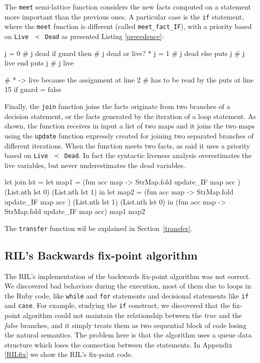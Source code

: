 \documentclass[a4paper]{article}   %
\begin{document}
The \texttt{meet} semi-lattice function considers the new facts computed on a statement more important than the previous ones. A particular case is the \texttt{if} statement, where the \texttt{meet} function is different (called \texttt{meet\_fact\_IF}), with a priority based on \texttt{Live $\prec$ Dead} as presented Listing \ref{precedence}: 
\begin{ruby}[frame=tb, label=precedence, caption={Particular case for the \texttt{meet} function}]
j = 0                       # j dead
if guard then               # j dead or live? *
    j = 1                   # j dead
else
    puts j                  # j live
end
puts j                      # j live

# * -> live because the assignment at line 2
# has to be read by the puts at line 15 if guard = false
\end{ruby}

Finally, the \texttt{join} function joins the facts originate from two branches of a decision statement, or the facts generated by the iteration of a loop statement. As shown, the function receives in input a list of two maps and it joins the two maps using the \texttt{update} function expressly created for joining two separated branches of different iterations. 
When the function meets two facts, as said it uses a priority based on \texttt{Live $\prec$ Dead}. In fact the syntactic liveness analysis overestimates the live variables, but never underestimates the dead variables.
\begin{ocaml}
 let join lst =	
     let map1 = (fun acc map -> 
                    StrMap.fold update_IF map acc
                ) (List.nth lst 0) (List.nth lst 1) in
         let map2 = (fun acc map -> 
                        StrMap.fold update_IF map acc
                    ) (List.nth lst 1) (List.nth lst 0) in
             (fun acc map -> 
                    StrMap.fold update_IF map acc) map1 map2	 
\end{ocaml}
The \texttt{transfer} function wil be explained in Section~\ref{transfer}.
\subsection{RIL's Backwards fix-point algorithm}
\label{theirFix}
The RIL's implementation of the backwards fix-point algorithm was not correct. We discovered bad behaviors during the execution, most of them due to loops in the Ruby code, like \texttt{while} and \texttt{for} statements and decisional statements like \texttt{if} and \texttt{case}.  For example, studying the \texttt{if} construct, we discovered that the fix-point algorithm could not maintain the relationship between the \emph{true} and the \emph{false} branches, and it simply treats them as two sequential block of code losing the natural  semantics. The problem here is that the algorithm uses a queue data structure which loses the connection between the statements. 
In Appendix \ref{RILfix} we show the RIL's fix-point code.
\end{document}

